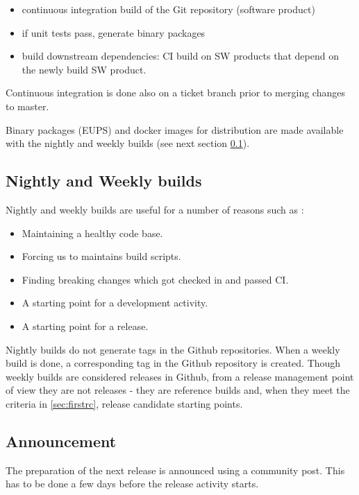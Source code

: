 \begin{itemize}
\item continuous integration build of the Git repository (software product)
\item if unit tests pass, generate binary packages
\item build downstream dependencies: CI build on SW products that depend on the newly build SW product.
\end{itemize}

Continuous integration is done also on a ticket branch prior to merging changes to master. 

Binary packages (EUPS) and docker images for distribution are made available with the nightly and weekly builds (see next section \ref{sec:weekly}).


\subsection{Nightly and Weekly builds} \label{sec:weekly}

Nightly and weekly builds are  useful for a number of reasons such as :
\begin{itemize}
	\item Maintaining a healthy code base.
	\item Forcing us to maintains build scripts.
	\item Finding breaking changes which got checked in and passed CI.
	\item A starting point for a development activity.
	\item A starting point for a release.
\end{itemize}

Nightly builds do not generate tags in the Github repositories.
When a weekly build is done, a corresponding tag in the Github repository is created.
Though weekly builds are considered releases in Github, from a release management point of view they are not
releases - they are reference builds and, when they meet the criteria in \ref{sec:firstrc}, release candidate starting points.


\subsection{Announcement} \label{sec:anaouncement}

The preparation of the next release is announced using a community post.
This has to be done a few days before the release activity starts.


